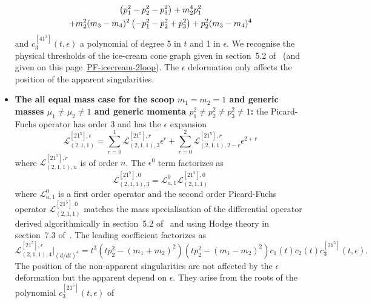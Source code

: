 \documentclass[a4paper,12pt]{article}
\numberwithin{equation}{section}
\numberwithin{figure}{subsection}
\theoremstyle{plain}
\theoremstyle{plain}
\theoremstyle{definition}
\theoremstyle{plain}
\theoremstyle{remark}
\theoremstyle{plain}
\begin{document}
\begin{itemize}
\begin{multline}
   \left(p_{1}^2-p_{2}^2-p_{3}^2\right)+m_{2}^4 p_{1}^2\cr+m_{2}^2 (m_{3}-m_{4})^2
   \left(-p_{1}^2-p_{2}^2+p_{3}^2\right)+p_{2}^2 (m_{3}-m_{4})^4
 \end{multline}
 and $c^{[41^3]}_3(t,\epsilon)$ a polynomial of  degree 5 in $t$ and 1 in
 $\epsilon$. We recognise the physical thresholds of the ice-cream
 cone graph given in section~5.2 of~\cite{Lairez:2022zkj} (and given
 on this
 page~\href{https://nbviewer.org/github/pierrevanhove/PicardFuchs/blob/main/PF-icecream-2loop.ipynb}{PF-icecream-2loop}). The
 $\epsilon$ deformation only affects the position of the apparent singularities. 
  \item \textbf{The all equal mass case for the scoop
  $m_1=m_2=1$ and generic masses $\mu_1\neq\mu_2\neq1$ and generic
  momenta  $p_1^2\neq p_2^2\neq
  p_3^2\neq 1$:}  the Picard-Fuchs operator has order 3 and has the
  $\epsilon$ expansion
   \begin{equation}
       \mathscr{L}_{(2,1,1)}^{[21^5],\epsilon}=\sum_{r=0}^1
       \mathscr{L}_{(2,1,1),3}^{[21^5],r} \epsilon^r+ \sum_{r=0}^2   \mathscr{L}_{(2,1,1),2-r}^{[21^5],r} \epsilon^{2+r}
     \end{equation}
     where $ \mathscr{L}_{(2,1,1),n}^{[21^5],r}$  is of order $n$. The
     $\epsilon^0$ term factorizes as
     \begin{equation}
           \mathscr{L}_{(2,1,1),3}^{[21^5],0}=\mathscr{L}_{a,1}^0 \mathscr{L}_{(2,1,1)}^{[21^5] ,0      }
         \end{equation}
         where $\mathscr{L}_{a,1}^0$ is a first order operator and the second order
         Picard-Fuchs operator  $\mathscr{L}_{(2,1,1)}^{[21^5] ,0}
         $ matches the mass specialisation of the differential
         operator derived algorithmically in section~5.2
         of~\cite{Lairez:2022zkj} and using Hodge theory in
         section~7.3 of~\cite{DHPPV}.
           The leading coefficient factorizes as
         \begin{equation}
                     \mathscr{L}_{(2,1,1),4}^{[21^5],\epsilon}\Big|_{(d/dt)^4}=t^3
                     (tp_2^2-(m_1+m_2)^2)(tp_2^2-(m_1-m_2)^2) c_1(t)
                     c_2(t) c^{[21^5]}_3(t,\epsilon)   .
                   \end{equation}
                 The position of the non-apparent singularities are
                 not affected by the $\epsilon$ deformation but the
                 apparent depend on $\epsilon$. They arise from the
                 roots of the polynomial $c^{[21^5]}_3(t,\epsilon)   $ of

\end{itemize}
\end{document}
